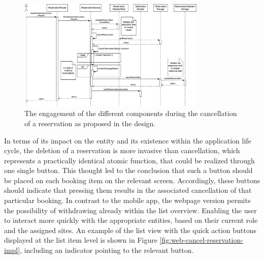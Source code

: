 \newpage

\begin{figure}[h]
    \centering
    \includegraphics[width=0.8\textwidth,keepaspectratio]{resources/images/main/6_implementation/processes/ReservationCancel.png}
    \caption{The engagement of the different components during the cancellation of a reservation as proposed in the design.}
    \label{fig:cancel-reservation-seqflow}
\end{figure}

\noindent In terms of its impact on the entity and its existence within the application life cycle, the deletion of a reservation is more invasive than cancellation, which represents a practically identical atomic function, that could be realized through one single button. 
This thought led to the conclusion that such a button should be placed on each booking item on the relevant screen. Accordingly, these buttons should indicate that pressing them results in the associated cancellation of that particular booking.
In contrast to the mobile app, the webpage version permits the possibility of withdrawing already within the list overview. Enabling the user to interact more quickly with the appropriate entities, based on their current role and the assigned sites.
An example of the list view with the quick action buttons displayed at the list item level is shown in Figure \ref{fig:web-cancel-reservation-impl}, including an indicator pointing to the relevant button.

